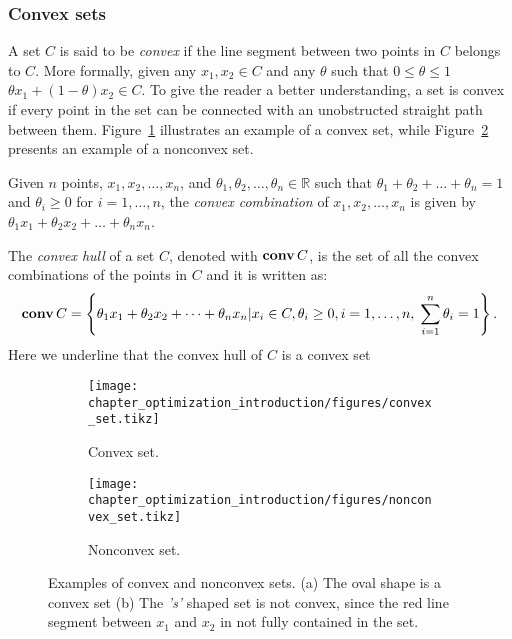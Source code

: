 \subsubsection{Convex sets}
A set $C$ is said to be \emph{convex} if the line segment between two points in $C$ belongs to $C$. More formally, given any $x_1, x_2 \in C$ and any $\theta$ such that $0 \le \theta \le 1$ $\theta x_1 + ( 1-\theta) x_2 \in C$.
To give the reader a better understanding, a set is convex if every point in the set can be connected with an unobstructed straight path between them. Figure~\ref{fig:convex_set} illustrates an example of a convex set, while Figure~\ref{fig:nonconvex_set} presents an example of a nonconvex set.
\par
Given $n$ points, $x_1, x_2, \dots, x_n$, and $\theta_1, \theta_2, \dots, \theta_n \in \mathbb{R}$ such that $\theta_1+ \theta_2+ \dots +  \theta_n = 1$ and $\theta_i \ge 0$ for $i = 1, \dots, n$, the \emph{convex combination} of $x_1, x_2, \dots, x_n$ is given by $\theta_1 x_1 +  \theta_2 x_2 + \dots + \theta_n x_n$.
\par
The \emph{convex hull} of a set $C$, denoted with $\operatorname*{\textbf{conv}} C$, is the set of all the convex combinations of the points in $C$ and it is written as:
\begin{equation}
    \operatorname*{\textbf{conv}} C = \left\{ \theta_1 x_1 +  \theta_2 x_2 + \dots + \theta_n x_n | x_i \in C, \theta_i \ge 0, i=1,\dots, n,\; \sum_{i = 1}^{n} \theta_i = 1 \right\}.
\end{equation}
Here we underline that the convex hull of $C$ is a convex set 
\begin{figure}[t]
\centering
    \begin{subfigure}[b]{0.48\textwidth}
        \centering
        \texttt{[image: chapter\_optimization\_introduction/figures/convex\_set.tikz]}
        \caption{Convex set.}
        \label{fig:convex_set}
    \end{subfigure}
    \hfill
    \begin{subfigure}[b]{0.48\textwidth}
        \centering
        \texttt{[image: chapter\_optimization\_introduction/figures/nonconvex\_set.tikz]}
        \caption{Nonconvex set.}
        \label{fig:nonconvex_set}
    \end{subfigure}
	\caption[Examples of convex and nonconvex sets]{Examples of convex and nonconvex sets. (a) The oval shape is a convex set (b) The \emph{'s'} shaped set is not convex, since the red line segment between $x_1$ and $x_2$ in not fully contained in the set.}
	\label{fig:convex_nonconvex_sets}
\end{figure}

